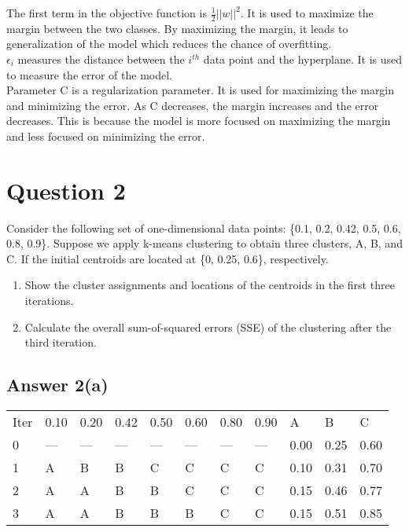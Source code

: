 \documentclass{article}
\begin{document}
The first term in the objective function is $\frac{1}{2} ||w||^2$. It is used to maximize the margin between the two classes. By maximizing the margin, it leads to generalization of the model which reduces the chance of overfitting.
\\
$\epsilon_i$ measures the distance between the $i^{th}$ data point and the hyperplane. It is used to measure the error of the model. 
\\
Parameter C is a regularization parameter. It is used for maximizing the margin and minimizing the error. As C decreases, the margin increases and the error decreases. This is because the model is more focused on maximizing the margin and less focused on minimizing the error.
\section{Question 2}

Consider the following set of one-dimensional data points: \{0.1, 0.2, 0.42, 0.5, 0.6, 0.8, 0.9\}. Suppose we apply k-means clustering to obtain three clusters, A, B, and C. If the initial centroids are located at \{0, 0.25, 0.6\}, respectively.

\begin{enumerate}[label= (\alph*)]
    \item Show the cluster assignments and locations of the centroids in the first three iterations.
    \item Calculate the overall sum-of-squared errors (SSE) of the clustering after the third iteration.
\end{enumerate}

\subsection{Answer 2(a)}

\begin{table}[ht]
    \centering
    \begin{tabular}{lllllllllll}
    Iter & 0.10 & 0.20 & 0.42 & 0.50 & 0.60 & 0.80 & 0.90 & A & B & C \\
    0 & --- & --- & --- & --- & --- & --- & --- & 0.00 & 0.25 & 0.60 \\
    1 & A & B & B & C & C & C & C & 0.10 & 0.31 & 0.70 \\
    2 & A & A & B & B & C & C & C & 0.15 & 0.46 & 0.77 \\
    3 & A & A & B & B & B & C & C & 0.15 & 0.51 & 0.85
    \end{tabular}
\end{table}
\end{document}
